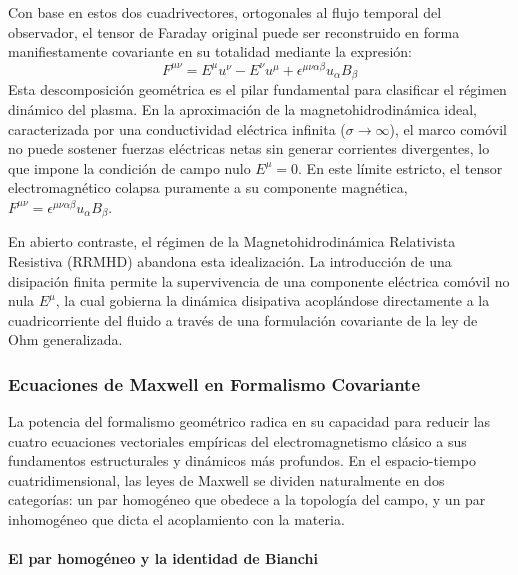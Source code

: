 Con base en estos dos cuadrivectores, ortogonales al flujo temporal del observador, el tensor de Faraday original puede ser reconstruido en forma manifiestamente covariante en su totalidad mediante la expresión:
\begin{equation}
    F^{\mu\nu} = E^\mu u^\nu - E^\nu u^\mu + \epsilon^{\mu\nu\alpha\beta} u_\alpha B_\beta
\end{equation}
Esta descomposición geométrica es el pilar fundamental para clasificar el régimen dinámico del plasma. En la aproximación de la magnetohidrodinámica ideal, caracterizada por una conductividad eléctrica infinita ($\sigma \to \infty$), el marco comóvil no puede sostener fuerzas eléctricas netas sin generar corrientes divergentes, lo que impone la condición de campo nulo $E^\mu = 0$. En este límite estricto, el tensor electromagnético colapsa puramente a su componente magnética, $F^{\mu\nu} = \epsilon^{\mu\nu\alpha\beta} u_\alpha B_\beta$. 

En abierto contraste, el régimen de la Magnetohidrodinámica Relativista Resistiva (RRMHD) abandona esta idealización. La introducción de una disipación finita permite la supervivencia de una componente eléctrica comóvil no nula $E^\mu$, la cual gobierna la dinámica disipativa acoplándose directamente a la cuadricorriente del fluido a través de una formulación covariante de la ley de Ohm generalizada.

\subsubsection{Ecuaciones de Maxwell en Formalismo Covariante}

\primerparrafo La potencia del formalismo geométrico radica en su capacidad para reducir las cuatro ecuaciones vectoriales empíricas del electromagnetismo clásico a sus fundamentos estructurales y dinámicos más profundos. En el espacio-tiempo cuatridimensional, las leyes de Maxwell se dividen naturalmente en dos categorías: un par homogéneo que obedece a la topología del campo, y un par inhomogéneo que dicta el acoplamiento con la materia.

\paragraph{El par homogéneo y la identidad de Bianchi}

